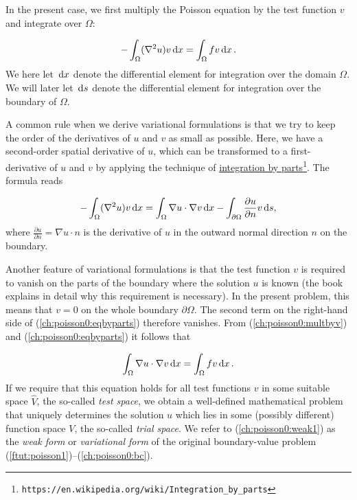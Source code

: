 \documentclass[graybox,envcountchap,sectrefs,final]{svmonodo}
\begin{document}

In the present case, we first multiply the Poisson equation
by the test function $v$ and integrate over $\Omega$:

\begin{equation}
\label{ch:poisson0:multbyv}
 -\int_\Omega (\nabla^2 u)v \, \mathrm{d}x = \int_\Omega fv \, \mathrm{d}x\thinspace . \end{equation}
We here let $\, \mathrm{d}x$ denote the differential element for integration over
the domain $\Omega$. We will later let $\, \mathrm{d}s$ denote the differential
element for integration over the boundary of $\Omega$.

A common rule when we derive variational formulations is that we try
to keep the order of the derivatives of $u$ and $v$ as small as
possible. Here, we have a second-order spatial derivative of $u$,
which can be transformed to a first-derivative of $u$ and $v$ by
applying the technique of \href{{https://en.wikipedia.org/wiki/Integration_by_parts}}{integration by parts}\footnote{\texttt{https://en.wikipedia.org/wiki/Integration\_by\_parts}}. The formula
reads

\begin{equation}
\label{ch:poisson0:eqbyparts}
 -\int_\Omega (\nabla^2 u)v \, \mathrm{d}x
= \int_\Omega\nabla u\cdot\nabla v \, \mathrm{d}x - \int_{\partial\Omega}{\partial u\over
\partial n}v \, \mathrm{d}s ,
\end{equation}
where $\frac{\partial u}{\partial n} = \nabla u \cdot n$ is the
derivative of $u$ in the outward normal direction $n$ on the
boundary.

Another feature of variational formulations is that
the test function $v$ is required to vanish on the parts of
the boundary where the solution $u$ is known (the book \cite{Langtangen_Mardal_FEM_2016} explains in detail why this requirement is necessary).
In the present
problem, this means that $v=0$ on the whole boundary $\partial\Omega$.
The second term on the right-hand side of
(\ref{ch:poisson0:eqbyparts}) therefore vanishes. From
(\ref{ch:poisson0:multbyv}) and (\ref{ch:poisson0:eqbyparts}) it
follows that

\begin{equation}
\int_\Omega\nabla u\cdot\nabla v \, \mathrm{d}x = \int_\Omega fv \, \mathrm{d}x\thinspace .
\label{ch:poisson0:weak1}
\end{equation}
If we require that this equation holds for all test functions $v$ in
some suitable space $\hat V$, the so-called \emph{test space}, we obtain a
well-defined mathematical problem that uniquely determines the
solution $u$ which lies in some (possibly different) function space
$V$, the so-called \emph{trial space}.  We refer to
(\ref{ch:poisson0:weak1}) as the \emph{weak form} or \emph{variational form} of
the original boundary-value problem
(\ref{ftut:poisson1})--(\ref{ch:poisson0:bc}).
\end{document}
